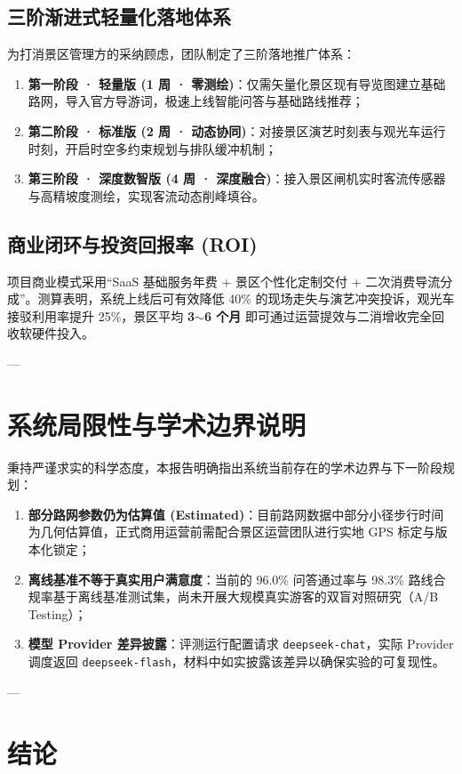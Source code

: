\documentclass[11pt,a4paper]{ctexart}
\begin{document}
\subsection{三阶渐进式轻量化落地体系}
为打消景区管理方的采纳顾虑，团队制定了三阶落地推广体系：
\begin{enumerate}
    \item \textbf{第一阶段 · 轻量版 (1 周 · 零测绘)}：仅需矢量化景区现有导览图建立基础路网，导入官方导游词，极速上线智能问答与基础路线推荐；
    \item \textbf{第二阶段 · 标准版 (2 周 · 动态协同)}：对接景区演艺时刻表与观光车运行时刻，开启时空多约束规划与排队缓冲机制；
    \item \textbf{第三阶段 · 深度数智版 (4 周 · 深度融合)}：接入景区闸机实时客流传感器与高精坡度测绘，实现客流动态削峰填谷。
\end{enumerate}

\subsection{商业闭环与投资回报率 (ROI)}
项目商业模式采用“SaaS 基础服务年费 + 景区个性化定制交付 + 二次消费导流分成”。测算表明，系统上线后可有效降低 40\% 的现场走失与演艺冲突投诉，观光车接驳利用率提升 25\%，景区平均 \textbf{3$\sim$6 个月} 即可通过运营提效与二消增收完全回收软硬件投入。

---

\section{系统局限性与学术边界说明}

秉持严谨求实的科学态度，本报告明确指出系统当前存在的学术边界与下一阶段规划：
\begin{enumerate}
    \item \textbf{部分路网参数仍为估算值 (Estimated)}：目前路网数据中部分小径步行时间为几何估算值，正式商用运营前需配合景区运营团队进行实地 GPS 标定与版本化锁定；
    \item \textbf{离线基准不等于真实用户满意度}：当前的 96.0\% 问答通过率与 98.3\% 路线合规率基于离线基准测试集，尚未开展大规模真实游客的双盲对照研究（A/B Testing）；
    \item \textbf{模型 Provider 差异披露}：评测运行配置请求 \texttt{deepseek-chat}，实际 Provider 调度返回 \texttt{deepseek-flash}，材料中如实披露该差异以确保实验的可复现性。
\end{enumerate}

---

\section{结论}
\end{document}
